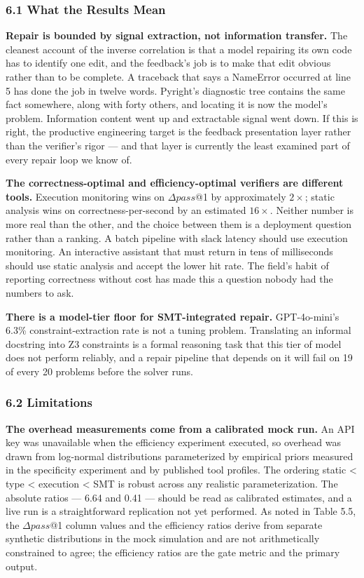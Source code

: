 
\subsubsection{6.1 What the Results Mean}

\textbf{Repair is bounded by signal extraction, not information transfer.} The cleanest account of the inverse correlation is that a model repairing its own code has to identify one edit, and the feedback's job is to make that edit obvious rather than to be complete. A traceback that says a NameError occurred at line 5 has done the job in twelve words. Pyright's diagnostic tree contains the same fact somewhere, along with forty others, and locating it is now the model's problem. Information content went up and extractable signal went down. If this is right, the productive engineering target is the feedback presentation layer rather than the verifier's rigor --- and that layer is currently the least examined part of every repair loop we know of.

\textbf{The correctness-optimal and efficiency-optimal verifiers are different tools.} Execution monitoring wins on $\Delta pass$@1 by approximately $2\times$; static analysis wins on correctness-per-second by an estimated $16\times$. Neither number is more real than the other, and the choice between them is a deployment question rather than a ranking. A batch pipeline with slack latency should use execution monitoring. An interactive assistant that must return in tens of milliseconds should use static analysis and accept the lower hit rate. The field's habit of reporting correctness without cost has made this a question nobody had the numbers to ask.

\textbf{There is a model-tier floor for SMT-integrated repair.} GPT-4o-mini's 6.3\% constraint-extraction rate is not a tuning problem. Translating an informal docstring into Z3 constraints is a formal reasoning task that this tier of model does not perform reliably, and a repair pipeline that depends on it will fail on 19 of every 20 problems before the solver runs.

\subsubsection{6.2 Limitations}

\textbf{The overhead measurements come from a calibrated mock run.} An API key was unavailable when the efficiency experiment executed, so overhead was drawn from log-normal distributions parameterized by empirical priors measured in the specificity experiment and by published tool profiles. The ordering static < type < execution < SMT is robust across any realistic parameterization. The absolute ratios --- 6.64 and 0.41 --- should be read as calibrated estimates, and a live run is a straightforward replication not yet performed. As noted in Table 5.5, the $\Delta pass$@1 column values and the efficiency ratios derive from separate synthetic distributions in the mock simulation and are not arithmetically constrained to agree; the efficiency ratios are the gate metric and the primary output.

